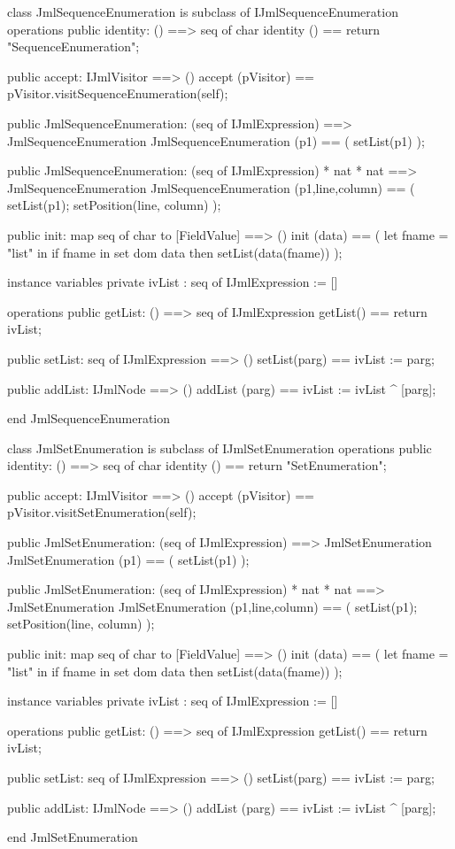 \begin{vdm_al}
class JmlSequenceEnumeration is subclass of IJmlSequenceEnumeration
operations
  public identity: () ==> seq of char
  identity () == return "SequenceEnumeration";

  public accept: IJmlVisitor ==> ()
  accept (pVisitor) == pVisitor.visitSequenceEnumeration(self);

  public JmlSequenceEnumeration:
    (seq of IJmlExpression) ==> JmlSequenceEnumeration
  JmlSequenceEnumeration (p1) == 
    ( setList(p1) );

  public JmlSequenceEnumeration:
    (seq of IJmlExpression) *
    nat *
    nat ==> JmlSequenceEnumeration
  JmlSequenceEnumeration (p1,line,column) == 
    ( setList(p1);
      setPosition(line, column) );

  public init: map seq of char to [FieldValue] ==> ()
  init (data) ==
    ( let fname = "list" in
        if fname in set dom data
        then setList(data(fname)) );

instance variables
  private ivList : seq of IJmlExpression := []

operations
  public getList: () ==> seq of IJmlExpression
  getList() == return ivList;

  public setList: seq of IJmlExpression ==> ()
  setList(parg) == ivList := parg;

  public addList: IJmlNode ==> ()
  addList (parg) == ivList := ivList ^ [parg];

end JmlSequenceEnumeration
\end{vdm_al}

\begin{vdm_al}
class JmlSetEnumeration is subclass of IJmlSetEnumeration
operations
  public identity: () ==> seq of char
  identity () == return "SetEnumeration";

  public accept: IJmlVisitor ==> ()
  accept (pVisitor) == pVisitor.visitSetEnumeration(self);

  public JmlSetEnumeration:
    (seq of IJmlExpression) ==> JmlSetEnumeration
  JmlSetEnumeration (p1) == 
    ( setList(p1) );

  public JmlSetEnumeration:
    (seq of IJmlExpression) *
    nat *
    nat ==> JmlSetEnumeration
  JmlSetEnumeration (p1,line,column) == 
    ( setList(p1);
      setPosition(line, column) );

  public init: map seq of char to [FieldValue] ==> ()
  init (data) ==
    ( let fname = "list" in
        if fname in set dom data
        then setList(data(fname)) );

instance variables
  private ivList : seq of IJmlExpression := []

operations
  public getList: () ==> seq of IJmlExpression
  getList() == return ivList;

  public setList: seq of IJmlExpression ==> ()
  setList(parg) == ivList := parg;

  public addList: IJmlNode ==> ()
  addList (parg) == ivList := ivList ^ [parg];

end JmlSetEnumeration
\end{vdm_al}

